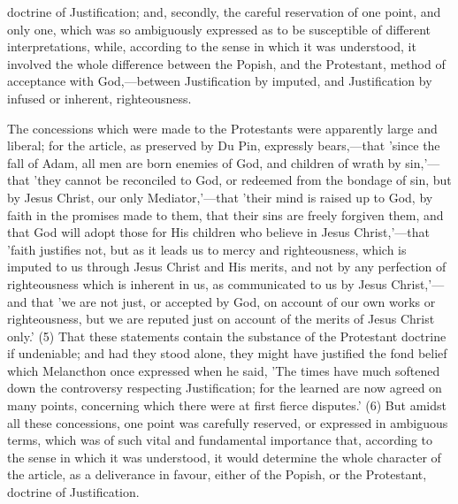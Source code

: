 \documentclass[
]{book}
\begin{document}
doctrine of Justification; and, secondly, the careful reservation of one point, and only one, which was so ambiguously expressed as to be susceptible of different interpretations, while, according to the sense in which it was understood, it involved the whole difference between the Popish, and the Protestant, method of acceptance with God,---between Justification by imputed, and Justification by infused or inherent, righteousness.

The concessions which were made to the Protestants were apparently large and liberal; for the article, as preserved by Du Pin, expressly bears,---that 'since the fall of Adam, all men are born enemies of God, and children of wrath by sin,'---that 'they cannot be reconciled to God, or redeemed from the bondage of sin, but by Jesus Christ, our only Mediator,'---that 'their mind is raised up to God, by faith in the promises made to them, that their sins are freely forgiven them, and that God will adopt those for His children who believe in Jesus Christ,'---that 'faith justifies not, but as it leads us to mercy and righteousness, which is imputed to us through Jesus Christ and His merits, and not by any perfection of righteousness which is inherent in us, as communicated to us by Jesus Christ,'---and that 'we are not just, or accepted by God, on account of our own works or righteousness, but we are reputed just on account of the merits of Jesus Christ only.' (5) That these statements contain the substance of the Protestant doctrine if undeniable; and had they stood alone, they might have justified the fond belief which Melancthon once expressed when he said, 'The times have much softened down the controversy respecting Justification; for the learned are now agreed on many points, concerning which there were at first fierce disputes.' (6) But amidst all these concessions, one point was carefully reserved, or expressed in ambiguous terms, which was of such vital and fundamental importance that, according to the sense in which it was understood, it would determine the whole character of the article, as a deliverance in favour, either of the Popish, or the Protestant, doctrine of Justification.
\end{document}
